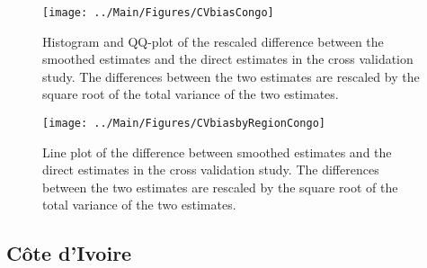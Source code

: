 \documentclass[12pt]{article}\usepackage[]{graphicx}\usepackage[]{color}
\newenvironment{knitrout}{}{} %
\begin{document}
\begin{knitrout}
\color{fgcolor}\begin{figure}[bht]

{\centering \texttt{[image: ../Main/Figures/CVbiasCongo]} 

}

\caption[Histogram and QQ-plot of the rescaled difference between the smoothed estimates and the direct estimates in the cross validation study]{Histogram and QQ-plot of the rescaled difference between the smoothed estimates and the direct estimates in the cross validation study. The differences between the two estimates are rescaled by the square root of the total variance of the two estimates.}\label{fig:unnamed-chunk-79}
\end{figure}


\end{knitrout}

\begin{knitrout}
\color{fgcolor}\begin{figure}[bht]

{\centering \texttt{[image: ../Main/Figures/CVbiasbyRegionCongo]} 

}

\caption[Line plot of the difference between smoothed estimates and the direct estimates in the cross validation study]{Line plot of the difference between smoothed estimates and the direct estimates in the cross validation study. The differences between the two estimates are rescaled by the square root of the total variance of the two estimates.}\label{fig:unnamed-chunk-80}
\end{figure}


\end{knitrout}

\clearpage
\subsection{C\^{o}te d'Ivoire}


\end{document}
